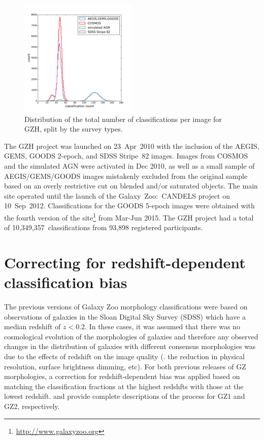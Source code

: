 \documentclass[twocolumn]{aastex6}
\begin{document}
\begin{figure}
\center
\includegraphics[width=0.5\textwidth]{figures/classification_hist.pdf}
\caption{Distribution of the total number of classifications per image for GZH, split by the survey types.}
\label{fig:classification_hist}
\end{figure}

The GZH project was launched on 23~Apr~2010 with the inclusion of the AEGIS, GEMS, GOODS 2-epoch, and SDSS Stripe~82 images. Images from COSMOS and the simulated AGN were activated in Dec 2010, as well as a small sample of AEGIS/GEMS/GOODS images mistakenly excluded from the original sample based on an overly restrictive cut on blended and/or saturated objects. The main site operated until the launch of the Galaxy~Zoo:~CANDELS project on 10~Sep~2012. Classifications for the GOODS 5-epoch images were obtained with the fourth version of the site\footnote{\url{http://www.galaxyzoo.org}} from Mar-Jun 2015. The GZH project had a total of 10,349,357~classifications from 93,898 registered participants. %

\section{Correcting for redshift-dependent classification bias}\label{sec:debiasing}

The previous versions of Galaxy Zoo morphology classifications \citep{lin08,wil13} were based on observations of galaxies in the Sloan Digital Sky Survey (SDSS) which have a median redshift of $z<0.2$. In these cases, it was assumed that there was no cosmological evolution of the morphologies of galaxies and therefore any observed changes in the distribution of galaxies with different consensus morphologies was due to the effects of redshift on the image quality (\ie. the reduction in physical resolution, surface brightness dimming, etc). For both previous releases of GZ morphologies, a correction for redshift-dependent bias was applied based on matching the classification fractions at the highest redshfts with those at the lowest redshift. \citet{bam09} and \citet{wil13} provide complete descriptions of the process for GZ1 and GZ2, respectively.
\end{document}

